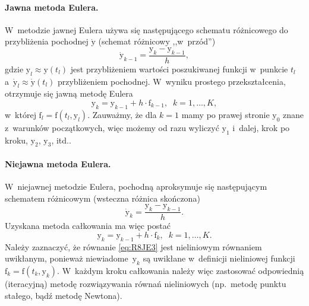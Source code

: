 \documentclass[paper=a4,DIV=12]{tmmlab}
\newcommand{\brm}[1]{\bm{\mathrm{#1}}}
\begin{document}
\begin{appendices}
\paragraph{Jawna metoda Eulera.}
W~metodzie jawnej Eulera używa się następującego schematu różnicowego do
przybliżenia pochodnej $\dot{\brm{y}}$ (schemat różnicowy ,,w~przód'')
\begin{equation}
  \dot{\brm{y}}_{k-1} = \frac{\brm{y}_{k} - \brm{y}_{k-1}}{h},
  \label{eq:IHSVX}
\end{equation}
gdzie $\brm{y}_{l} \approx \brm{y}\left(t_l\right)$ jest przybliżeniem wartości
poszukiwanej funkcji w~punkcie $t_l$ a~$\dot{\brm{y}}_{l} \approx
\dot{\brm{y}}(t_l)$ przybliżeniem pochodnej. W~wyniku prostego przekształcenia,
otrzymuje się jawną metodę Eulera
\begin{equation}
  \brm{y}_k = \brm{y}_{k-1} + h \cdot \brm{f}_{k-1},\;\;k = 1,\dots,K,
 \label{eq:3PVVU}
\end{equation}
w~której $\brm{f}_l = \brm{f}\left(t_l, \brm{y}_l\right)$. Zauważmy, że dla
$k=1$ mamy po prawej stronie $\brm{y}_0$ znane z~warunków początkowych, więc
możemy od razu wyliczyć $\brm{y}_1$ i~dalej, krok po kroku, $\brm{y}_2$,
$\brm{y}_3$, itd..

\paragraph{Niejawna metoda Eulera.}
W~niejawnej metodzie Eulera, pochodną aproksymuje się następującym schematem
różnicowym (wsteczna różnica skończona)
\begin{equation}
  \dot{\brm{y}}_k = \frac{\brm{y}_{k} - \brm{y}_{k-1}}{h}.
  \label{eq:YNJO9}
\end{equation}
Uzyskana metoda całkowania ma więc postać
\begin{equation}
  \brm{y}_k = \brm{y}_{k-1} + h \cdot \brm{f}_{k},\;\;k = 1,\dots,K.
  \label{eq:R8JE3}
\end{equation}
Należy zaznaczyć, że równanie \eqref{eq:R8JE3} jest nieliniowym równaniem
uwikłanym, ponieważ niewiadome~$\brm{y}_k$ są uwikłane w~definicji nieliniowej
funkcji $\brm{f}_k = \brm{f}(t_k,\brm{y}_k)$. W~każdym kroku całkowania należy
więc zastosować odpowiednią (iteracyjną) metodę rozwiązywania równań
nieliniowych (np.~metodę punktu stałego, bądź metodę Newtona).


\end{appendices}
\end{document}
